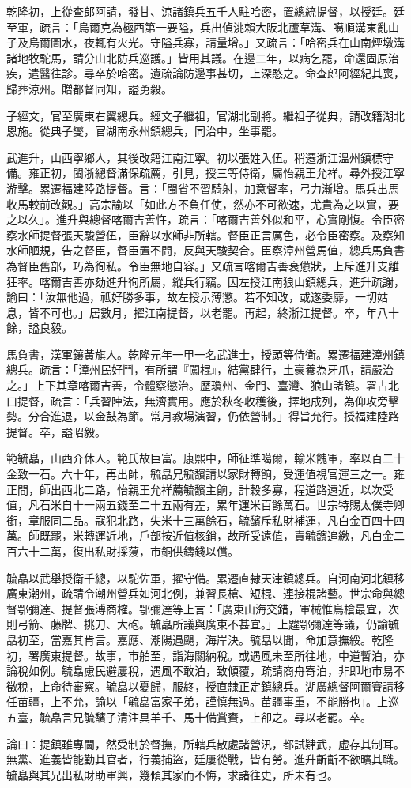 \begin{pinyinscope}
乾隆初，上從查郎阿請，發甘、涼諸鎮兵五千人駐哈密，置總統提督，以授廷。廷至軍，疏言：「烏爾克為極西第一要隘，兵出偵洮賴大阪北蘆草溝、噶順溝東亂山子及烏爾圖水，夜輒有火光。守隘兵寡，請量增。」又疏言：「哈密兵在山南煙墩溝諸地牧駝馬，請分山北防兵巡護。」皆用其議。在邊二年，以病乞罷，命還固原治疾，遣醫往診。尋卒於哈密。遺疏論防邊事甚切，上深愍之。命查郎阿經紀其喪，歸葬涼州。贈都督同知，謚勇毅。

子經文，官至廣東右翼總兵。經文子繼祖，官湖北副將。繼祖子從典，請改籍湖北恩施。從典子燮，官湖南永州鎮總兵，同治中，坐事罷。

武進升，山西寧鄉人，其後改籍江南江寧。初以張姓入伍。稍遷浙江溫州鎮標守備。雍正初，閩浙總督滿保疏薦，引見，授三等侍衛，屬怡親王允祥。尋外授江寧游擊。累遷福建陸路提督。言：「閩省不習騎射，加意督率，弓力漸增。馬兵出馬收馬較前改觀。」高宗諭以「如此方不負任使，然亦不可欲速，尤貴為之以實，要之以久」。進升與總督喀爾吉善忤，疏言：「喀爾吉善外似和平，心實剛愎。令臣密察水師提督張天駿營伍，臣辭以水師非所轄。督臣正言厲色，必令臣密察。及察知水師陋規，告之督臣，督臣置不問，反與天駿契合。臣察漳州營馬值，總兵馬負書為督臣舊部，巧為徇私。令臣無地自容。」又疏言喀爾吉善衰憊狀，上斥進升支離狂率。喀爾吉善亦劾進升徇所屬，縱兵行竊。因左授江南狼山鎮總兵，進升疏謝，諭曰：「汝無他過，祗好勝多事，故左授示薄懲。若不知改，或遂委靡，一切姑息，皆不可也。」居數月，擢江南提督，以老罷。再起，終浙江提督。卒，年八十餘，謚良毅。

馬負書，漢軍鑲黃旗人。乾隆元年一甲一名武進士，授頭等侍衛。累遷福建漳州鎮總兵。疏言：「漳州民好鬥，有所謂『闖棍』，結黨肆行，土豪養為牙爪，請嚴治之。」上下其章喀爾吉善，令體察懲治。歷瓊州、金門、臺灣、狼山諸鎮。署古北口提督，疏言：「兵習陣法，無濟實用。應於秋冬收穫後，擇地成列，為仰攻旁擊勢。分合進退，以金鼓為節。常月教場演習，仍依營制。」得旨允行。授福建陸路提督。卒，謚昭毅。

範毓皛，山西介休人。範氏故巨富。康熙中，師征準噶爾，輸米餽軍，率以百二十金致一石。六十年，再出師，毓皛兄毓馪請以家財轉餉，受運值視官運三之一。雍正間，師出西北二路，怡親王允祥薦毓馪主餉，計穀多寡，程道路遠近，以次受值，凡石米自十一兩五錢至二十五兩有差，累年運米百餘萬石。世宗特賜太僕寺卿銜，章服同二品。寇犯北路，失米十三萬餘石，毓馪斥私財補運，凡白金百四十四萬。師既罷，米轉運近地，戶部按近值核銷，故所受遠值，責毓馪追繳，凡白金二百六十二萬，復出私財採蓡，市銅供鑄錢以償。

毓皛以武舉授衛千總，以駝佐軍，擢守備。累遷直隸天津鎮總兵。自河南河北鎮移廣東潮州，疏請令潮州營兵如河北例，兼習長槍、短棍、連接棍諸藝。世宗命與總督鄂彌達、提督張溥商榷。鄂彌達等上言：「廣東山海交錯，軍械惟鳥槍最宜，次則弓箭、藤牌、挑刀、大砲。毓皛所議與廣東不甚宜。」上韙鄂彌達等議，仍諭毓皛初至，當嘉其肯言。嘉應、潮陽遇颶，海岸決。毓皛以聞，命加意撫綏。乾隆初，署廣東提督。故事，市舶至，詣海關納稅。或遇風未至所往地，中道暫泊，亦論稅如例。毓皛慮民避屢稅，遇風不敢泊，致傾覆，疏請商舟寄泊，非即地市易不徵稅，上命待審察。毓皛以憂歸，服終，授直隸正定鎮總兵。湖廣總督阿爾賽請移任苗疆，上不允，諭以「毓皛富家子弟，謹慎無過。苗疆事重，不能勝也」。上巡五臺，毓皛言兄毓馪子清注具羊千、馬十備賞賚，上卻之。尋以老罷。卒。

論曰：提鎮雖專閫，然受制於督撫，所轄兵散處諸營汛，都試肄武，虛存其制耳。無黨、進義皆能勤其官者，行義捕盜，廷屢從戰，皆有勞。進升齗齗不欲曠其職。毓皛與其兄出私財助軍興，幾傾其家而不悔，求諸往史，所未有也。


\end{pinyinscope}